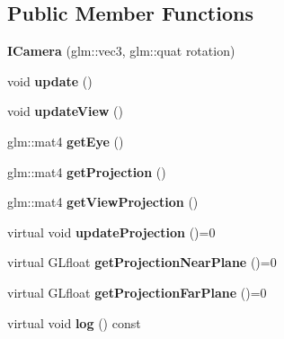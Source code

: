\subsection*{Public Member Functions}
\begin{DoxyCompactItemize}
\item 
{\bfseries I\+Camera} (glm\+::vec3, glm\+::quat rotation)\hypertarget{classflw_1_1flf_1_1ICamera_a3a28d3603bc703fc2abf412f30e17cde}{}\label{classflw_1_1flf_1_1ICamera_a3a28d3603bc703fc2abf412f30e17cde}

\item 
void {\bfseries update} ()\hypertarget{classflw_1_1flf_1_1ICamera_a9fcc6a75bb0f49d7308396eec9105a89}{}\label{classflw_1_1flf_1_1ICamera_a9fcc6a75bb0f49d7308396eec9105a89}

\item 
void {\bfseries update\+View} ()\hypertarget{classflw_1_1flf_1_1ICamera_a364eb58aa13b0ac004cdfd0c270d9b5a}{}\label{classflw_1_1flf_1_1ICamera_a364eb58aa13b0ac004cdfd0c270d9b5a}

\item 
glm\+::mat4 {\bfseries get\+Eye} ()\hypertarget{classflw_1_1flf_1_1ICamera_a13edf1c6809a1d64fda00ac05c3e26b6}{}\label{classflw_1_1flf_1_1ICamera_a13edf1c6809a1d64fda00ac05c3e26b6}

\item 
glm\+::mat4 {\bfseries get\+Projection} ()\hypertarget{classflw_1_1flf_1_1ICamera_a2dd407fba655d57f74f2cba0de9ec978}{}\label{classflw_1_1flf_1_1ICamera_a2dd407fba655d57f74f2cba0de9ec978}

\item 
glm\+::mat4 {\bfseries get\+View\+Projection} ()\hypertarget{classflw_1_1flf_1_1ICamera_a8af0d020d8a6a10a68f65162806c8a98}{}\label{classflw_1_1flf_1_1ICamera_a8af0d020d8a6a10a68f65162806c8a98}

\item 
virtual void {\bfseries update\+Projection} ()=0\hypertarget{classflw_1_1flf_1_1ICamera_a16c68d1fa6e5f7159a14c6aa018d1a84}{}\label{classflw_1_1flf_1_1ICamera_a16c68d1fa6e5f7159a14c6aa018d1a84}

\item 
virtual G\+Lfloat {\bfseries get\+Projection\+Near\+Plane} ()=0\hypertarget{classflw_1_1flf_1_1ICamera_aa6edd27ce33e246e70b946c1267406d6}{}\label{classflw_1_1flf_1_1ICamera_aa6edd27ce33e246e70b946c1267406d6}

\item 
virtual G\+Lfloat {\bfseries get\+Projection\+Far\+Plane} ()=0\hypertarget{classflw_1_1flf_1_1ICamera_a702a10b338e2612e673538d7f61ef289}{}\label{classflw_1_1flf_1_1ICamera_a702a10b338e2612e673538d7f61ef289}

\item 
virtual void {\bfseries log} () const \hypertarget{classflw_1_1flf_1_1ICamera_a0f7ac9abe0594bafef4e6a55c1c78c37}{}\label{classflw_1_1flf_1_1ICamera_a0f7ac9abe0594bafef4e6a55c1c78c37}

\end{DoxyCompactItemize}

